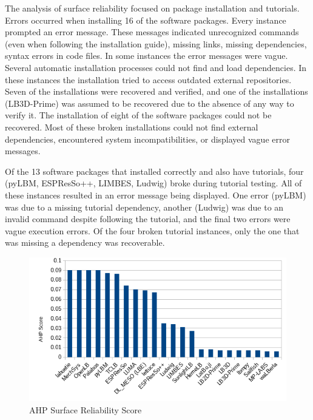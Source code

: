 \documentclass[12pt, notitlepage]{article}
\begin{document}
The analysis of surface reliability focused on package installation and tutorials. Errors occurred when installing 16 of the software packages. Every instance prompted an error message. These messages indicated unrecognized commands (even when following the installation guide), missing links, missing dependencies, syntax errors in code files. In some instances the error messages were vague. Several automatic installation processes could not find and load dependencies. In these instances the installation tried to access outdated external repositories. Seven of the installations were recovered and verified, and one of the installations (LB3D-Prime) was assumed to be recovered due to the absence of any way to verify it. The installation of eight of the software packages could not be recovered. Most of these broken installations could not find external dependencies, encountered system incompatibilities, or displayed vague error messages. 

Of the 13 software packages that installed correctly and also have tutorials, four (pyLBM, ESPResSo++, LIMBES, Ludwig) broke during tutorial testing. All of these instances resulted in an error message being displayed. One error (pyLBM) was due to a missing tutorial dependency, another (Ludwig) was due to an invalid command despite following the tutorial, and the final two errors were vague execution errors. Of the four broken tutorial instances, only the one that was missing a dependency was recoverable. 

\begin{figure}[h!]
	\begin{center}
		\includegraphics[width=1.0\textwidth]{reliability_chart}
		\caption{AHP Surface Reliability Score}
		\label{Fig_Reliability}
	\end{center}
\end{figure}
\end{document}
